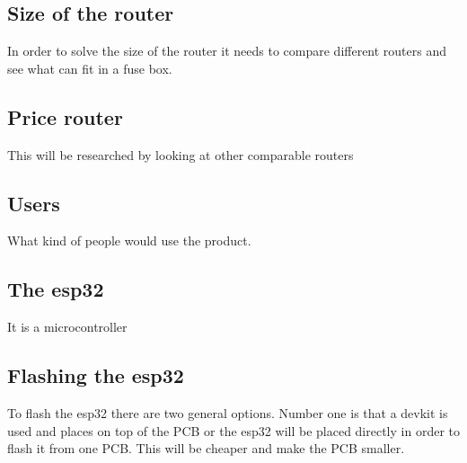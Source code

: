 \subsection{Size of the router}
In order to solve the size of the router it needs to compare different routers and see what can fit in a fuse box. 

\subsection{Price router}
This will be researched by looking at other comparable routers

\subsection{Users}
What kind of people would use the product.

\subsection{The esp32}
It is a microcontroller

\subsection{Flashing the esp32}
To flash the esp32 there are two general options. Number one is that a devkit is used and places on top of the PCB or the esp32 will be placed directly in order to flash it from one PCB. This will be cheaper and make the PCB smaller.
